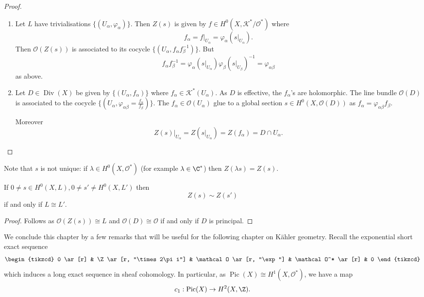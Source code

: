 \documentclass[a4paper]{article}
\DeclareMathOperator{\Pic}{Pic} %
\DeclareMathOperator{\Div}{Div} %
\begin{document}
\begin{proof}\leavevmode
  \begin{enumerate}
  \item Let \(L\) have trivialisations \(\{(U_\alpha, \varphi_\alpha)\}\). Then \(Z(s)\) is given by \(f \in H^0(X, \mathcal K^*/\mathcal O^*)\) where
    \[
      f_\alpha = f|_{U_\alpha} = \varphi_\alpha(s|_{U_\alpha}).
    \]
    Then \(\mathcal O(Z(s))\) is associated to its cocycle \(\{(U_\alpha, f_\alpha f_\beta^{-1})\}\). But
    \[
      f_\alpha f_\beta^{-1}
      = \varphi_\alpha(s|_{U_\alpha}) \varphi_\beta(s|_{U_\beta})^{-1}
      = \varphi_{\alpha\beta}
    \]
    as above.
  \item Let \(D \in \Div(X)\) be given by \(\{(U_\alpha, f_\alpha)\}\) where \(f_\alpha \in \mathcal K^*(U_\alpha)\). As \(D\) is effective, the \(f_\alpha\)'s are holomorphic. The line bundle \(\mathcal O(D)\) is associated to the cocycle \(\{(U_\alpha, \varphi_{\alpha\beta} = \frac{f_\alpha}{f_\beta})\}\). The \(f_\alpha \in \mathcal O(U_\alpha)\) glue to a global section \(s \in H^0(X, \mathcal O(D))\) as \(f_\alpha = \varphi_{\alpha\beta} f_\beta\).

    Moreover
    \[
      Z(s)|_{U_\alpha} = Z(s|_{U_\alpha}) = Z(f_\alpha) = D \cap U_\alpha.
    \]
  \end{enumerate}
\end{proof}

Note that \(s\) is not unique: if \(\lambda \in H^0(X, \mathcal O^*)\) (for example \(\lambda \in \C^*\)) then \(Z(\lambda s) = Z(s)\).

\begin{corollary}
  If \(0 \neq s \in H^0(X, L), 0 \neq s' \neq H^0(X, L')\) then
  \[
    Z(s) \sim Z(s')
  \]
  if and only if \(L \cong L'\).
\end{corollary}

\begin{proof}
  Follows as \(\mathcal O(Z(s)) \cong L\) and \(\mathcal O(D) \cong \mathcal O\) if and only if \(D\) is principal.
\end{proof}

We conclude this chapter by a few remarks that will be useful for the following chapter on Kähler geometry. Recall the exponential short exact sequence
\[
  \begin{tikzcd}
    0 \ar[r] & \Z \ar[r, "\times 2\pi i"] & \mathcal O \ar[r, "\exp"] & \mathcal O^* \ar[r] & 0
  \end{tikzcd}
\]
which induces a long exact sequence in sheaf cohomology. In particular, as \(\Pic(X) \cong H^1(X, \mathcal O^*)\), we have a map
\[
  c_1: \Pic(X) \to H^2(X, \Z).
\]
\end{document}

